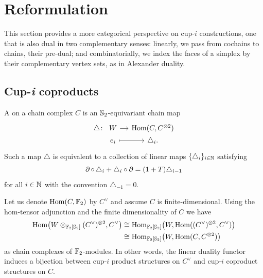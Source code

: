 
\section{Reformulation}\label{s:reformulation}

This section provides a more categorical perspective on \mbox{cup-$i$} constructions, one that is also dual in two complementary senses:
linearly, we pass from cochains to chains, their pre-dual; and combinatorially, we index the faces of a simplex by their complementary vertex sets, as in Alexander duality.

\subsection{Cup-\textit{i} coproducts}

A  on a chain complex $C$ is an $\mathbb{S}_2$-equivariant chain map
\[
\begin{tikzcd}[column sep=small,row sep=0]
	\triangle \colon &[-15pt] W \rar & \Hom(C, C^{\ot 2}) \\
	& e_i \rar[maps to] & \triangle_i.
\end{tikzcd}
\]
Such a map $\triangle$ is equivalent to a collection of linear maps $\{\triangle_i\}_{i\in\mathbb{N}}$ satisfying
\[
\operatorname{\partial} \circ \, \triangle_i + \triangle_i \circ \operatorname{\partial} =
(1+T) \triangle_{i-1}
\]
for all $i \in \mathbb{N}$ with the convention $\triangle_{-1} = 0$.

Let us denote $\mathrm{Hom}(C, {\mathbb{F}_2})$ by $C^\vee$ and assume $C$ is finite-dimensional.
Using the hom-tensor adjunction and the finite dimensionality of $C$ we have
\begin{equation}\label{eq:hom-tensor}
	\begin{split}
		\mathrm{Hom} \big(W \otimes_{{\mathbb{F}_2}[\mathbb{S}_2]} (C^\vee)^{\otimes 2}, C^\vee \big) & \cong
		\mathrm{Hom}_{{\mathbb{F}_2}[\mathbb{S}_2]} \big( W, \mathrm{Hom}((C^\vee)^{\otimes 2}, C^\vee) \big) \\ & \cong
		\mathrm{Hom}_{{\mathbb{F}_2}[\mathbb{S}_2]} \big( W, \mathrm{Hom}(C, C^{\otimes 2}) \big)
	\end{split}
\end{equation}
as chain complexes of ${\mathbb{F}_2}$-modules.
In other words, the linear duality functor induces a bijection between \mbox{cup-$i$} product structures on $C^\vee$ and cup-$i$ coproduct structures on $C$.

%

